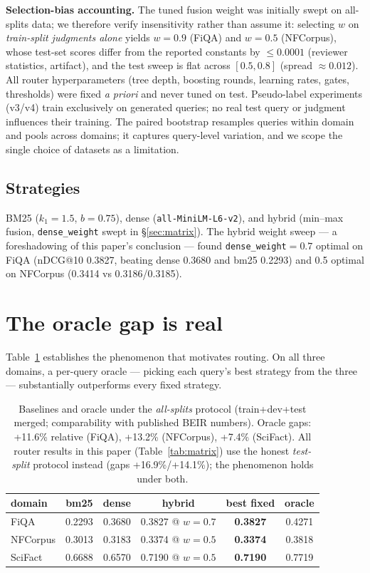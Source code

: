 \documentclass[11pt]{article}
\begin{document}
\textbf{Selection-bias accounting.} The tuned fusion weight was initially swept on all-splits data; we therefore verify insensitivity rather than assume it: selecting $w$ on \emph{train-split judgments alone} yields $w{=}0.9$ (FiQA) and $w{=}0.5$ (NFCorpus), whose test-set scores differ from the reported constants by ${\le}0.0001$ (reviewer statistics, artifact), and the test sweep is flat across $[0.5,0.8]$ (spread ${\approx}0.012$). All router hyperparameters (tree depth, boosting rounds, learning rates, gates, thresholds) were fixed \emph{a priori} and never tuned on test. Pseudo-label experiments (v3/v4) train exclusively on generated queries; no real test query or judgment influences their training. The paired bootstrap resamples queries within domain and pools across domains; it captures query-level variation, and we scope the single choice of datasets as a limitation.

\subsection{Strategies}
BM25 ($k_1{=}1.5$, $b{=}0.75$), dense (\texttt{all-MiniLM-L6-v2}), and hybrid (min--max fusion, \texttt{dense\_weight} swept in \S\ref{sec:matrix}). The hybrid weight sweep --- a foreshadowing of this paper's conclusion --- found \texttt{dense\_weight}${=}0.7$ optimal on FiQA (nDCG@10 0.3827, beating dense 0.3680 and bm25 0.2293) and 0.5 optimal on NFCorpus (0.3414 vs 0.3186/0.3185).

\section{The oracle gap is real}
Table~\ref{tab:baselines} establishes the phenomenon that motivates routing. On all three domains, a per-query oracle --- picking each query's best strategy from the three --- substantially outperforms every fixed strategy.

\begin{table}[H]
\centering\small
\begin{tabular}{lccccc}
\toprule
domain & bm25 & dense & hybrid & best fixed & oracle \\
\midrule
FiQA     & 0.2293 & 0.3680 & 0.3827 @ $w{=}0.7$ & \textbf{0.3827} & 0.4271 \\
NFCorpus & 0.3013 & 0.3183 & 0.3374 @ $w{=}0.5$ & \textbf{0.3374} & 0.3818 \\
SciFact  & 0.6688 & 0.6570 & 0.7190 @ $w{=}0.5$ & \textbf{0.7190} & 0.7719 \\
\bottomrule
\end{tabular}
\caption{Baselines and oracle under the \emph{all-splits} protocol (train+dev+test merged; comparability with published BEIR numbers). Oracle gaps: +11.6\% relative (FiQA), +13.2\% (NFCorpus), +7.4\% (SciFact). All router results in this paper (Table~\ref{tab:matrix}) use the honest \emph{test-split} protocol instead (gaps +16.9\%/+14.1\%); the phenomenon holds under both.}
\label{tab:baselines}
\end{table}
\end{document}
